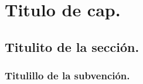 \chapter{Titulo de cap.}
\onehalfspacing
\section{Titulito de la sección.}
\subsection{Titulillo de la subvención.}
